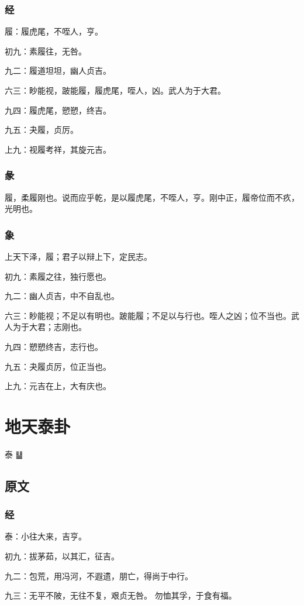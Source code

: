 \documentclass[12pt,oneside]{book}
\begin{document}
\subsection{经}
履：履虎尾，不咥人，亨。

初九：素履往，无咎。

九二：履道坦坦，幽人贞吉。

六三：眇能视，跛能履，履虎尾，咥人，凶。武人为于大君。

九四：履虎尾，愬愬，终吉。

九五：夬履，贞厉。

上九：视履考祥，其旋元吉。

\subsection{彖}
履，柔履刚也。说而应乎乾，是以履虎尾，不咥人，亨。刚中正，履帝位而不疚，光明也。

\subsection{象}
上天下泽，履；君子以辩上下，定民志。

初九：素履之往，独行愿也。

九二：幽人贞吉，中不自乱也。

六三：眇能视；不足以有明也。跛能履；不足以与行也。咥人之凶；位不当也。武人为于大君；志刚也。

九四：愬愬终吉，志行也。

九五：夬履贞厉，位正当也。

上九：元吉在上，大有庆也。


\chapter{地天泰卦}
泰 {\Large ䷊}

\section{原文}

\subsection{经}
泰：小往大来，吉亨。

初九：拔茅茹，以其汇，征吉。

九二：包荒，用冯河，不遐遗，朋亡，得尚于中行。

九三：无平不陂，无往不复，艰贞无咎。 勿恤其孚，于食有福。
\end{document}
